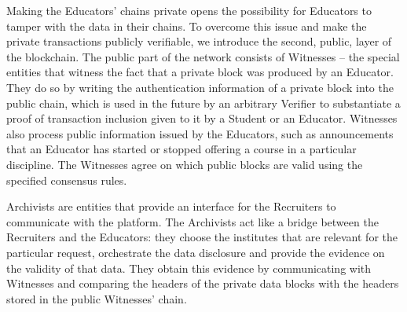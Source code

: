 Making the Educators' chains private opens the possibility for Educators to tamper with the data in their chains. To overcome this issue and make the private transactions publicly verifiable, we introduce the second, public, layer of the blockchain. The public part of the network consists
of Witnesses – the special entities that witness the fact that a private block was produced by an  Educator.
They do so by writing the authentication information of a private block into the public chain, which is used in the future by an arbitrary Verifier to substantiate a proof of transaction inclusion given to it by a Student or an Educator. Witnesses also process public information issued by the Educators, such as announcements that an Educator has started or stopped offering a course in a particular discipline. The Witnesses agree on which public blocks are valid using the specified consensus rules.

Archivists are entities that provide an interface for the Recruiters to communicate with the platform. The Archivists act like a bridge between the Recruiters and the Educators: they choose the institutes that are relevant for the particular request, orchestrate the data disclosure and provide the evidence on the validity of that data. They obtain this evidence by communicating with Witnesses and comparing the headers of the private data blocks with the headers stored in the public Witnesses' chain.
